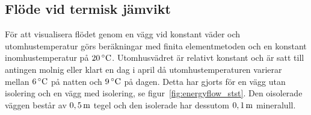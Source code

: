 \subsection{Flöde vid termisk jämvikt}
\label{sec:steadystatewall}



För att visualisera flödet genom en vägg vid konstant väder och utomhustemperatur görs 
beräkningar med finita elementmetoden och en konstant inomhustemperatur på 
$\unit[20]{^\circ C}$. Utomhusvädret är relativt konstant och är satt till antingen molnig 
eller klart en dag i april då utomhustemperaturen varierar mellan $\unit[6]{^\circ C}$ på natten och $\unit[9]{^\circ C}$ på dagen. Detta har gjorts för en vägg utan isolering och en vägg med 
isolering, se figur~\ref{fig:energyflow_stst}. Den oisolerade väggen består av 
$\unit[0,5]{m}$ tegel och den isolerade har dessutom $\unit[0,1]{m}$ mineralull. 

